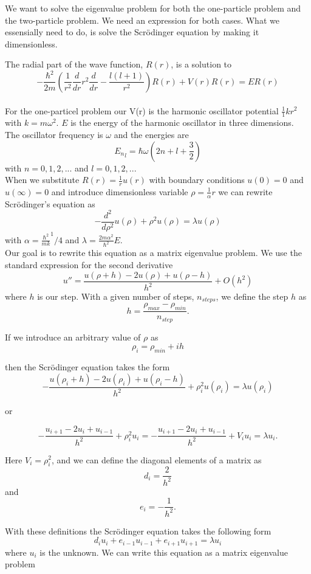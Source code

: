 \documentclass[a4paper,12pt, english]{article}
\begin{document}
We want to solve the eigenvalue problem for both the one-particle problem and the two-particle problem. We need an expression for both cases. 
What we essensially need to do, is solve the Scr\"odinger equation by making it dimensionless. 

The radial part of the wave function, $R(r)$, is a solution to 
\\
$$ -\frac{\hbar^2}{2m}(\frac{1}{r^2}\frac{d}{dr}r^2\frac{d}{dr} - \frac{l(l+1)}{r^2})R(r) + V(r)R(r) = ER(r)  $$
\\

For the one-particel problem our V(r) is the harmonic oscillator potential $\frac{1}{1}kr^2$ with $k=m\omega^2$. $E$ is the energy of the harmonic oscillator in three dimensions. The oscillator frequency is $\omega$ and the energies are
$$ {E_n}_l = \hbar\omega(2n + l + \frac{3}{2}) $$
with $n = 0,1,2,...$ and $l = 0,1,2,...$  \\
When we substitute $R(r) = \frac{1}{r}u(r)$ with boundary conditions $u(0) = 0$ and $u(\infty) = 0$ and introduce dimensionless variable $\rho = \frac{1}{\alpha}r$ we can rewrite Scr\"odinger's equation as 
$$ - \frac{d^2}{d\rho^2}u(\rho) + \rho^2u(\rho) = \lambda u(\rho) $$
with $\alpha = \frac{\hbar^2}{mk}^1/4$ and $\lambda = \frac{2m\alpha^2}{\hbar^2}E$. \\

Our goal is to rewrite this equation as a matrix eigenvalue problem. We use the standard expression for the second derivative $$ u'' = \frac{u(\rho + h) -2u(\rho) + u(\rho -h)}{h^2} + O(h^2) $$
where $h$ is our step.
With a given number of steps, $n_{steps}$, we define the step $h$ as $$h = \frac{\rho_{max}-\rho_{min}}{n_{step}}. $$

If we introduce an arbitrary value of $\rho$ as 
\\
$$\rho_{i} = \rho_{min} + ih$$

then the Scr\"odinger equation takes the form 
$$-\frac{u(\rho_i+h) -2u(\rho_i) +u(\rho_i-h)}{h^2}+\rho_i^2u(\rho_i)  = \lambda u(\rho_i)$$

or 

$$-\frac{u_{i+1} -2u_i +u_{i-1}}{h^2}+\rho_i^2u_i=-\frac{u_{i+1} -2u_i +u_{i-1} }{h^2}+V_iu_i  = \lambda u_i.$$

Here $V_{i} = \rho_i^2$, and we can define the diagonal elements of a matrix as 
$$d_i = \frac{2}{h^2}$$ and
$$e_i = -\frac{1}{h^2}.$$


With these definitions the Scr\"odinger equation takes the following form $$ d_iu_i + e_{i-1}u_{i-1} + e_{i+1}u_{i+1} = \lambda u_i $$
where $u_i$ is the unknown. We can write this equation as a matrix eigenvalue problem \\
\end{document}
